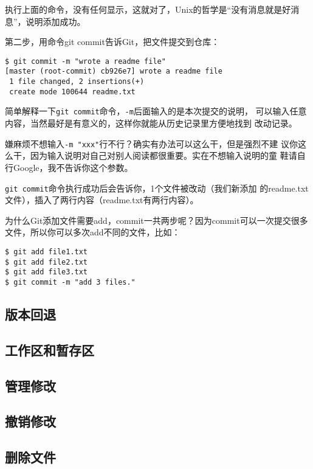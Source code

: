 执行上面的命令，没有任何显示，这就对了，Unix的哲学是“没有消息就是好消
息”，说明添加成功。

第二步，用命令git commit告诉Git，把文件提交到仓库：

\begin{verbatim}
$ git commit -m "wrote a readme file"
[master (root-commit) cb926e7] wrote a readme file
 1 file changed, 2 insertions(+)
 create mode 100644 readme.txt
\end{verbatim}

简单解释一下\verb|git commit|命令，\verb|-m|后面输入的是本次提交的说明，
可以输入任意内容，当然最好是有意义的，这样你就能从历史记录里方便地找到
改动记录。

嫌麻烦不想输入\verb|-m "xxx"|行不行？确实有办法可以这么干，但是强烈不建
议你这么干，因为输入说明对自己对别人阅读都很重要。实在不想输入说明的童
鞋请自行Google，我不告诉你这个参数。

\verb|git commit|命令执行成功后会告诉你，1个文件被改动（我们新添加
的readme.txt文件），插入了两行内容（readme.txt有两行内容）。

为什么Git添加文件需要add，commit一共两步呢？因为commit可以一次提交很多
文件，所以你可以多次add不同的文件，比如：

\begin{verbatim}
$ git add file1.txt
$ git add file2.txt
$ git add file3.txt
$ git commit -m "add 3 files."
\end{verbatim}

\subsection{版本回退}

\subsection{工作区和暂存区}

\subsection{管理修改}

\subsection{撤销修改}

\subsection{删除文件}

